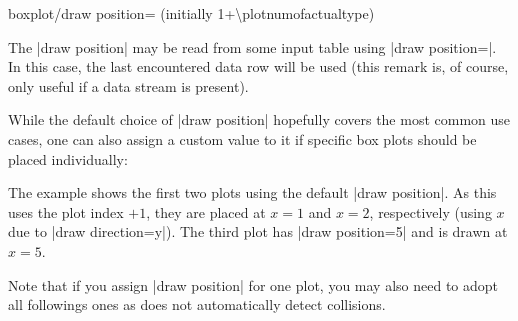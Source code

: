 \begin{pgfplotskey}{boxplot/draw position= (initially 1+\textbackslash plotnumofactualtype)}
\begin{codeexample}[]
\end{codeexample}

    \noindent The |draw position| may be read from some input table using
    |draw position=\thisrow|. In this case, the last encountered
    data row will be used (this remark is, of course, only useful if a data
    stream is present).

    While the default choice of |draw position| hopefully covers the most
    common use cases, one can also assign a custom value to it if specific box
    plots should be placed individually:
\begin{codeexample}[]
\end{codeexample}
    \noindent The example shows the first two plots using the default
    |draw position|. As this uses the plot index $+1$, they are placed at $x=1$
    and $x=2$, respectively (using $x$ due to |draw direction=y|). The third
    plot has |draw position=5| and is drawn at $x=5$.

    Note that if you assign |draw position| for one plot, you may also need to
    adopt all followings ones as \PGFPlots{} does not automatically detect
    collisions.
\end{pgfplotskey}

